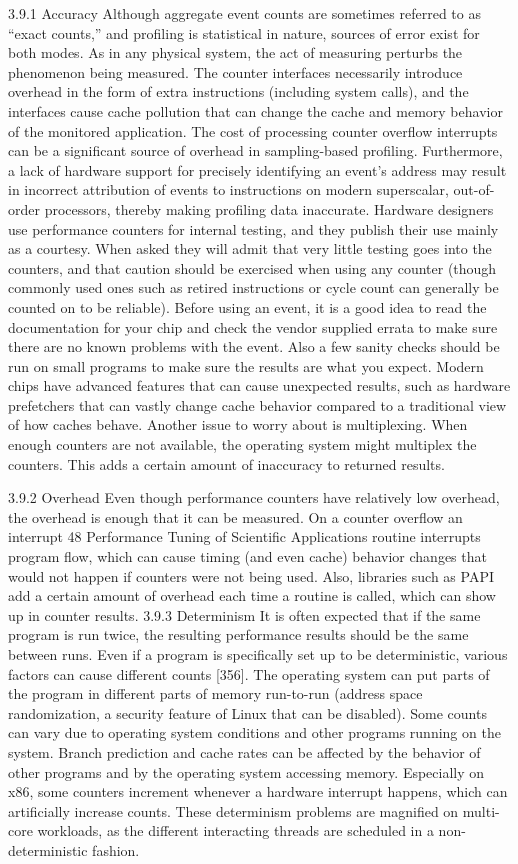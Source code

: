 3.9.1 Accuracy
    Although aggregate event counts are sometimes referred to as “exact counts,” and profiling is statistical in nature, sources of error exist for both modes. As in any physical system, the act of measuring perturbs the phenomenon being measured. The counter interfaces necessarily introduce overhead in the form of extra instructions (including system calls), and the interfaces cause cache pollution that can change the cache and memory behavior of the monitored application. The cost of processing counter overflow interrupts can be a significant source of overhead in sampling-based profiling. Furthermore, a lack of hardware support for precisely identifying an event’s address may result in incorrect attribution of events to instructions on modern superscalar, out-of-order processors, thereby making profiling data inaccurate. Hardware designers use performance counters for internal testing, and they publish their use mainly as a courtesy. When asked they will admit that very little testing goes into the counters, and that caution should be exercised when using any counter (though commonly used ones such as retired instructions or cycle count can generally be counted on to be reliable). Before using an event, it is a good idea to read the documentation for your chip and check the vendor supplied errata to make sure there are no known problems with the event. Also a few sanity checks should be run on small programs to make sure the results are what you expect. Modern chips have advanced features that can cause unexpected results, such as hardware prefetchers that can vastly change cache behavior compared to a traditional view of how caches behave. Another issue to worry about is multiplexing. When enough counters are not available, the operating system might multiplex the counters. This adds a certain amount of inaccuracy to returned results.

3.9.2 Overhead
    Even though performance counters have relatively low overhead, the overhead is enough that it can be measured. On a counter overflow an interrupt 48 Performance Tuning of Scientific Applications routine interrupts program flow, which can cause timing (and even cache) behavior changes that would not happen if counters were not being used. Also, libraries such as PAPI add a certain amount of overhead each time a routine is called, which can show up in counter results. 3.9.3 Determinism It is often expected that if the same program is run twice, the resulting performance results should be the same between runs. Even if a program is specifically set up to be deterministic, various factors can cause different counts [356]. The operating system can put parts of the program in different parts of memory run-to-run (address space randomization, a security feature of Linux that can be disabled). Some counts can vary due to operating system conditions and other programs running on the system. Branch prediction and cache rates can be affected by the behavior of other programs and by the operating system accessing memory. Especially on x86, some counters increment whenever a hardware interrupt happens, which can artificially increase counts. These determinism problems are magnified on multi-core workloads, as the different interacting threads are scheduled in a non-deterministic fashion.

